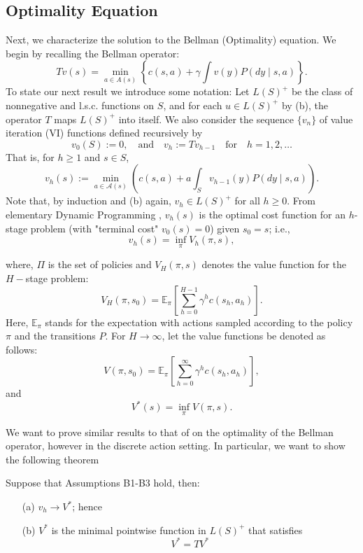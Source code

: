 \subsection{Optimality Equation}
Next, we characterize the solution to the Bellman (Optimality) equation. We begin by recalling the Bellman operator:
\[
T v(s) = \min_{a \in A(s)} \left\{ c(s, a) + \gamma \int v(y) P(dy \mid s, a) \right\}.
\]
To state our next result we introduce some notation: Let \( L(S)^+ \) be the class of nonnegative and l.s.c. functions on \( S \), and for each \( u \in L(S)^+ \) by (b), the operator \( T \) maps \( L(S)^+ \) into itself. We also consider the sequence \( \{v_n\} \) of value iteration (VI) functions defined recursively by
\[
v_0(S) := 0, \quad \text{and} \quad v_h := T v_{h-1} \quad \text{for} \quad h = 1, 2, \dots
\]
That is, for \( h \geq 1 \) and \( s \in S \),
\[
v_h(s) := \min_{a \in \mathcal{A}(s)} \left( c(s, a) + a \int_{S} v_{h-1}(y) P(dy \mid s, a) \right). \tag{4.3}
\]
Note that, by induction and (b) again, \( v_h \in L(S)^+ \) for all \( h \geq 0 \). From elementary Dynamic Programming \citet{bertsekas1987dynamic,bertsekas1996stochastic,dynkin1979controlled}, \( v_h(s) \) is the optimal cost function for an \( h \)-stage problem (with "terminal cost" \( v_0(s) = 0 \)) given \( s_0 = s \); i.e.,
\[
v_h(s) = \inf_{\pi } V_h(\pi, s), 
\]

where, $\Pi$ is the set of policies and $V_H(\pi, s)$ denotes the value function for the $H-$stage problem:
\[
V_H(\pi, s_0) = \mathbb{E}_{\pi}\left[ \sum_{h=0}^{H-1} \gamma^h c(s_h, a_h) \right].
\]
Here, \( \mathbb{E}_{\pi} \) stands for the expectation with actions sampled according to the policy \( \pi \) and the transitions \( P \). For $H\to \infty$, let the value functions be denoted as follows:
\[
V(\pi, s_0) = \mathbb{E}_{\pi}\left[ \sum_{h=0}^{\infty} \gamma^h c(s_h, a_h) \right],
\]
and
\[
V^*(s) = \inf_{\pi} V(\pi, s).
\]


We want to prove similar results to that of \citet[Theorem 4.2]{hernandez1992discrete} on the optimality of the Bellman operator, however in the discrete action setting. In particular, we want to show the following theorem

\begin{thm}\label{thm: Bellmannexistence}
Suppose that Assumptions B1-B3 hold, then:
\begin{itemize}
    \item[(a)] \( v_h \to V^* \); hence
    \item[(b)] \( V^* \) is the minimal pointwise function in \( L(S)^+ \) that satisfies
    \[
    V^* = T V^*
    \]
\end{itemize}
\end{thm}



